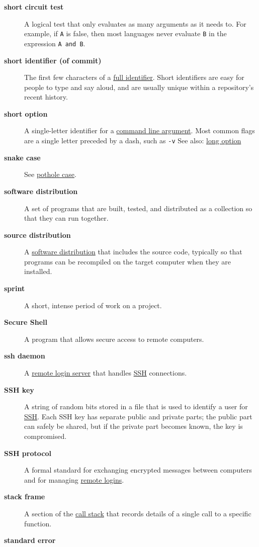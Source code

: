 \documentclass[
]{krantz}
\begin{document}
\begin{description}
\item[\textbf{short circuit test}]
A logical test that only evaluates as many arguments as it needs to. For example, if \texttt{A} is false, then most languages never evaluate \texttt{B} in the expression \texttt{A\ and\ B}.
\item[\textbf{short identifier (of commit)}]
The first few characters of a \protect\hyperlink{full_identifier_git}{full identifier}. Short identifiers are easy for people to type and say aloud, and are usually unique within a repository's recent history.
\item[\textbf{short option}]
A single-letter identifier for a \protect\hyperlink{command_line_argument}{command line argument}. Most common flags are a single letter preceded by a dash, such as \texttt{-v} See also: \protect\hyperlink{long_option}{long option}
\item[\textbf{snake case}]
See \protect\hyperlink{pothole_case}{pothole case}.
\item[\textbf{software distribution}]
A set of programs that are built, tested, and distributed as a collection so that they can run together.
\item[\textbf{source distribution}]
A \protect\hyperlink{software_distribution}{software distribution} that includes the source code, typically so that programs can be recompiled on the target computer when they are installed.
\item[\textbf{sprint}]
A short, intense period of work on a project.
\item[\textbf{Secure Shell}]
A program that allows secure access to remote computers.
\item[\textbf{ssh daemon}]
A \protect\hyperlink{remote_login_server}{remote login server} that handles \protect\hyperlink{ssh}{SSH} connections.
\item[\textbf{SSH key}]
A string of random bits stored in a file that is used to identify a user for \protect\hyperlink{ssh}{SSH}. Each SSH key has separate public and private parts; the public part can safely be shared, but if the private part becomes known, the key is compromised.
\item[\textbf{SSH protocol}]
A formal standard for exchanging encrypted messages between computers and for managing \protect\hyperlink{remote_login_server}{remote logins}.
\item[\textbf{stack frame}]
A section of the \protect\hyperlink{call_stack}{call stack} that records details of a single call to a specific function.
\item[\textbf{standard error}]

\end{description}
\end{document}

